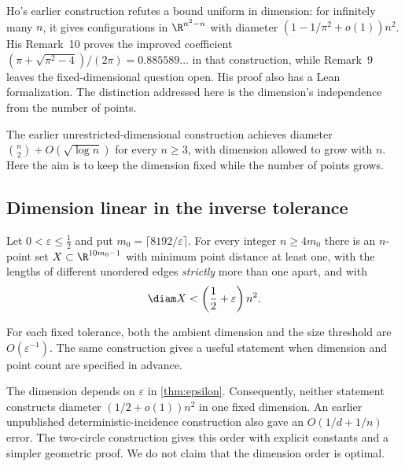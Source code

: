 Ho's earlier construction \cite{Ho} refutes a bound uniform in dimension:
for infinitely many $n$, it gives configurations in $\R^{n^2-n}$ with
diameter $(1-1/\pi^2+o(1))n^2$. His Remark~10 proves the improved coefficient
$(\pi+\sqrt{\pi^2-4})/(2\pi)=0.885589\ldots$ in that construction, while
Remark~9 leaves the fixed-dimensional question open. His proof also has a
Lean formalization. The distinction addressed here is the dimension's
independence from the number of points.

The earlier unrestricted-dimensional construction \cite{GrowingDimension}
achieves diameter $\binom n2+O(\sqrt{\log n})$ for every $n\ge3$, with
dimension allowed to grow with $n$. Here the aim is to keep the dimension
fixed while the number of points grows.

\subsection{Dimension linear in the inverse tolerance}

\begin{theorem}\label{thm:epsilon}
Let $0<\varepsilon\le\tfrac12$ and put
$m_0=\lceil8192/\varepsilon\rceil$. For every integer $n\ge4m_0$ there is an
$n$-point set $X\subset\R^{10m_0-1}$ with minimum point
distance at least one, with the lengths of different unordered edges
\emph{strictly} more than one apart, and with
\[
 \diam X<\left(\frac12+\varepsilon\right)n^2.
\]
\end{theorem}

For each fixed tolerance, both the ambient dimension and the size threshold
are $O(\varepsilon^{-1})$. The same construction gives a useful statement
when dimension and point count are specified in advance.


The dimension depends on $\varepsilon$ in \cref{thm:epsilon}. Consequently,
neither statement constructs diameter $(1/2+o(1))n^2$ in one fixed dimension.
An earlier unpublished deterministic-incidence construction
\cite{IncidenceNote} also gave an $O(1/d+1/n)$ error. The two-circle
construction gives this order with explicit constants and a simpler
geometric proof. We do not claim that the dimension order is optimal.

